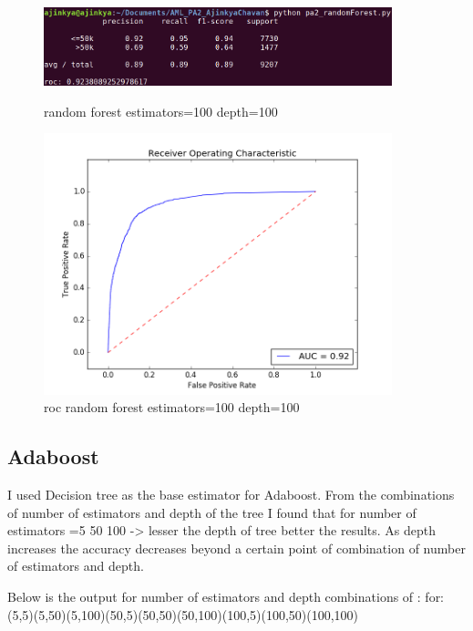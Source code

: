 \documentclass{article}
\begin{document}
\begin{figure}
    \centering
    \begin{minipage}{0.45\textwidth}
        \centering
        \includegraphics[width=0.9\textwidth]{random_100_100.png} %
        \caption{random forest estimators=100 depth=100}
    \end{minipage}\hfill
    \begin{minipage}{0.45\textwidth}
        \centering
        \includegraphics[width=0.9\textwidth]{roc_random_100_100.png} %
        \caption{roc random forest estimators=100 depth=100}
    \end{minipage}
\end{figure}

\pagebreak 
\pagebreak

\subsection{Adaboost}

I used Decision tree as the base estimator for Adaboost. From the combinations of number of estimators and depth of the tree I found that for number of estimators =5 50 100 -> lesser the depth of tree better the results. As depth increases the accuracy decreases beyond a certain point of combination of number of estimators and depth. 


Below is the output for number of estimators and depth combinations of : for:(5,5)(5,50)(5,100)(50,5)(50,50)(50,100)(100,5)(100,50)(100,100)
\end{document}

